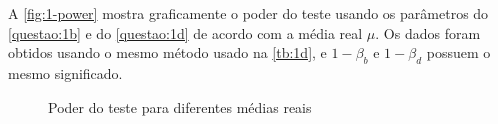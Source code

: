 

A \autoref{fig:1-power} mostra graficamente o poder do teste usando os parâmetros do \autoref{questao:1b} e do \autoref{questao:1d} de acordo com a média real $\mu$. Os dados foram obtidos usando o mesmo método usado na \autoref{tb:1d}, e $1 - \beta_b$ e $1 - \beta_d$ possuem o mesmo significado.

\begin{figure}[ht]
  \centering
  
  \caption{Poder do teste para diferentes médias reais}
  \label{fig:1-power}
\end{figure}

